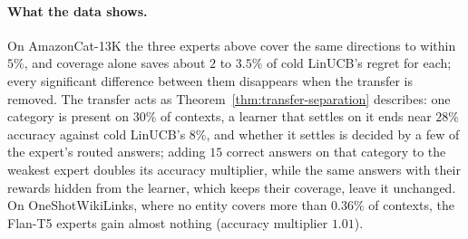 \documentclass{article}
\theoremstyle{definition}
\theoremstyle{remark}
\theoremstyle{remark}
\begin{document}
\paragraph{What the data shows.}
On AmazonCat-13K the three experts above cover the same directions to within
$5\%$, and coverage alone saves about $2$ to $3.5\%$ of cold LinUCB's regret
for each; every significant difference between them disappears when the
transfer is removed. The transfer acts as Theorem~\ref{thm:transfer-separation}
describes: one category is present on $30\%$ of contexts, a learner that
settles on it ends near $28\%$ accuracy against cold LinUCB's $8\%$, and
whether it settles is decided by a few of the expert's routed answers; adding
$15$ correct answers on that category to the weakest expert doubles its
accuracy multiplier, while the same answers with their rewards hidden from the
learner, which keeps their coverage, leave it unchanged. On OneShotWikiLinks, where no entity covers more than
$0.36\%$ of contexts, the Flan-T5 experts gain almost nothing (accuracy
multiplier $1.01$).
\end{document}
